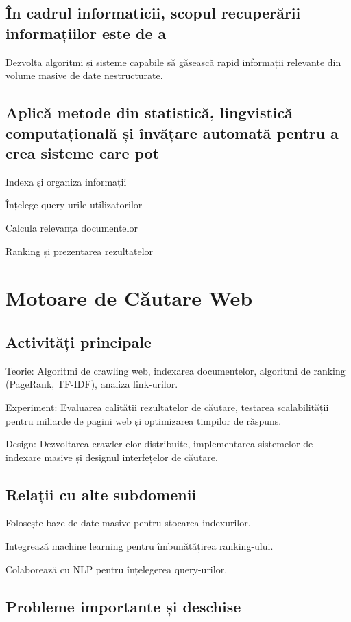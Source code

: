 \documentclass[12pt]{article}
\begin{document}
\subsection*{În cadrul informaticii, scopul recuperării informațiilor este de a}

Dezvolta algoritmi și sisteme capabile să găsească rapid informații relevante din volume masive de date nestructurate.

\subsection*{Aplică metode din statistică, lingvistică computațională și învățare automată pentru a crea sisteme care pot}

Indexa și organiza informații

Înțelege query-urile utilizatorilor

Calcula relevanța documentelor

Ranking și prezentarea rezultatelor

\section{Motoare de Căutare Web}

\subsection*{Activități principale}

Teorie: Algoritmi de crawling web, indexarea documentelor, algoritmi de ranking (PageRank, TF-IDF), analiza link-urilor.

Experiment: Evaluarea calității rezultatelor de căutare, testarea scalabilității pentru miliarde de pagini web și optimizarea timpilor de răspuns.

Design: Dezvoltarea crawler-elor distribuite, implementarea sistemelor de indexare masive și designul interfețelor de căutare.

\subsection*{Relații cu alte subdomenii}

Folosește baze de date masive pentru stocarea indexurilor.

Integrează machine learning pentru îmbunătățirea ranking-ului.

Colaborează cu NLP pentru înțelegerea query-urilor.

\subsection*{Probleme importante și deschise}
\end{document}
